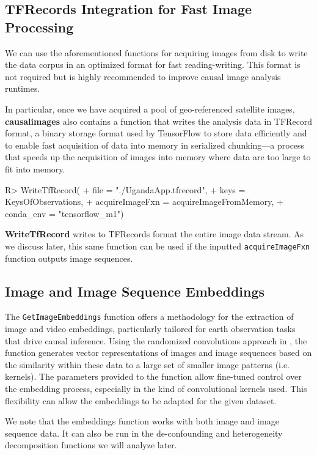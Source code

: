 \documentclass[nojss,shortnames]{jss} %
\begin{document}
\subsection{TFRecords Integration for Fast Image Processing}
We can use the aforementioned functions for acquiring images from disk to write the data corpus in an optimized format for fast reading-writing. This format is not required but is highly recommended to improve causal image analysis runtimes. 

In particular, once we have acquired a pool of geo-referenced satellite images, {\bf causalimages} also contains a function that writes the analysis data in TFRecord format, a binary storage format used by TensorFlow to store data efficiently and to enable fast acquisition of data into memory in serialized chunking---a process that speeds up the acquisition of images into memory where data are too large to fit into memory. 
\begin{CodeChunk}
\begin{CodeInput}
R> WriteTfRecord(
+    file = "./UgandaApp.tfrecord",
+    keys = KeysOfObservations,
+    acquireImageFxn = acquireImageFromMemory,
+    conda_env = "tensorflow_m1")
\end{CodeInput}
\end{CodeChunk}
{\bf WriteTfRecord} writes to TFRecords format the entire image data stream. As we discuss later, this same function can be used if the inputted \texttt{acquireImageFxn} function outputs image sequences. 

\subsection{Image and Image Sequence Embeddings}\label{s:Embeddings}
The \texttt{GetImageEmbeddings} function offers a methodology for the extraction of image and video embeddings, particularly tailored for earth observation tasks that drive causal inference. Using the randomized convolutions approach in  \citet{rolf2021generalizable}, the function generates vector representations of images and image sequences based on the similarity within these data to a large set of smaller image patterns (i.e. kernels). The parameters provided to the function allow fine-tuned control over the embedding process, especially in the kind of convolutional kernels used. This flexibility can allow the embeddings to be adapted for the given dataset. 

We note that the embeddings function works with both image and image sequence data. It can also be run in the de-confounding and heterogeneity decomposition functions we will analyze later. 
\end{document}
